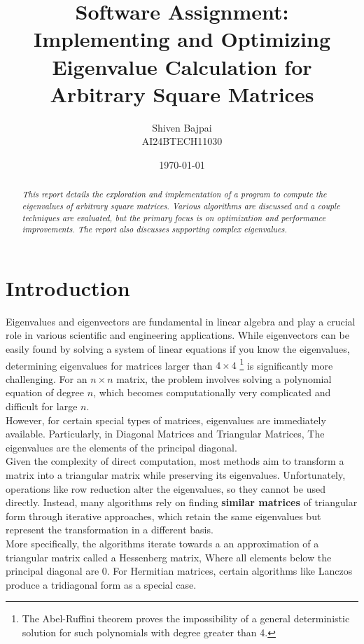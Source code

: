\documentclass[12pt,a4paper]{article}
\title{Software Assignment: Implementing and Optimizing Eigenvalue Calculation for Arbitrary Square Matrices}
\author{Shiven Bajpai\\\small AI24BTECH11030}
\date{\today}
\begin{document}
\maketitle

\begin{abstract}
\textit{This report details the exploration and implementation of a program to compute the eigenvalues of arbitrary square matrices. Various algorithms are discussed and a couple techniques are evaluated, but the primary focus is on optimization and performance improvements. The report also discusses supporting complex eigenvalues.}
\end{abstract}


\section{Introduction}

Eigenvalues and eigenvectors are fundamental in linear algebra and play a crucial role in various scientific and engineering applications. While eigenvectors can be easily found by solving a system of linear equations if you know the eigenvalues, determining eigenvalues for matrices larger than $4\times4$ \footnote{The Abel-Ruffini theorem proves the impossibility of a general deterministic solution for such polynomials with degree greater than 4.} is significantly more challenging. For an $n\times n$ matrix, the problem involves solving a polynomial equation of degree $n$, which becomes computationally very complicated and difficult for large $n$.
\\

However, for certain special types of matrices, eigenvalues are immediately available. Particularly, in Diagonal Matrices and Triangular Matrices, The eigenvalues are the elements of the principal diagonal.
\\

Given the complexity of direct computation, most methods aim to transform a matrix into a triangular matrix while preserving its eigenvalues. Unfortunately, operations like row reduction alter the eigenvalues, so they cannot be used directly. Instead, many algorithms rely on finding \textbf{similar matrices} of triangular form through iterative approaches, which retain the same eigenvalues but represent the transformation in a different basis.
\\

More specifically, the algorithms iterate towards a an approximation of a triangular matrix called a Hessenberg matrix, Where all elements below the principal diagonal are 0. For Hermitian matrices, certain algorithms like Lanczos produce a tridiagonal form as a special case.
\\
\end{document}

